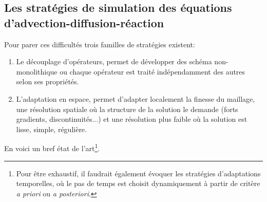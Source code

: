 \subsection{Les stratégies de simulation des équations d'advection-diffusion-réaction}
    Pour parer ces difficultés trois familles de stratégies existent:
    \begin{enumerate}[label=\Alph*.]
        \item Le découplage d’opérateurs, permet de développer des schéma non-monolithique ou chaque opérateur est traité indépendamment des autres selon ses propriétés. 
        \item L'adaptation en espace, permet d'adapter localement la finesse du maillage, une résolution spatiale où la structure de la solution le demande (forts gradients, discontinuités...)
        et une résolution plus faible où la solution est lisse, simple, régulière.
    \end{enumerate}
    En voici un bref état de l'art\footnote{
        Pour être exhaustif, il faudrait également évoquer les stratégies d'adaptations temporelles, où le pas de temps est
        choisit dynamiquement à partir de critère \textit{a priori} ou \textit{a posteriori}.}.
